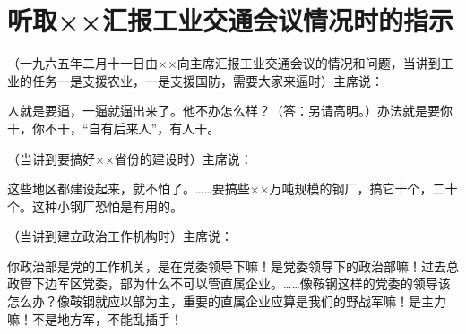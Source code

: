 \section[听取××汇报工业交通会议情况时的指示（一九六五年二月十一日）]{听取××汇报工业交通会议情况时的指示}


（一九六五年二月十一日由××向主席汇报工业交通会议的情况和问题，当讲到工业的任务一是支援农业，一是支援国防，需要大家来逼时）主席说：

人就是要逼，一逼就逼出来了。他不办怎么样？（答：另请高明。）办法就是要你干，你不干，“自有后来人”，有人干。

（当讲到要搞好××省份的建设时）主席说：

这些地区都建设起来，就不怕了。……要搞些××万吨规模的钢厂，搞它十个，二十个。这种小钢厂恐怕是有用的。

（当讲到建立政治工作机构时）主席说：

你政治部是党的工作机关，是在党委领导下嘛！是党委领导下的政治部嘛！过去总政管下边军区党委，部为什么不可以管直属企业。……像鞍钢这样的党委的领导该怎么办？像鞍钢就应以部为主，重要的直属企业应算是我们的野战军嘛！是主力嘛！不是地方军，不能乱插手！


